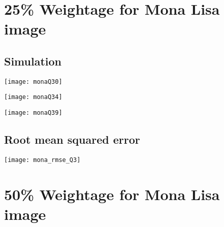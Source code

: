 \documentclass[a4paper, 12pt]{article}
\begin{document}
\section{25\% Weightage for Mona Lisa image}

\subsection{Simulation}
\begin{center}
\begin{minipage}{0.45\linewidth}
    \texttt{[image: monaQ30]}
    \label{fig:Q1_1}
\end{minipage}
\hfill
\begin{minipage}{0.45\linewidth}
    \texttt{[image: monaQ34]}
    \label{fig:Q1_2}
\end{minipage}
\vspace{1.5 em}

\begin{minipage}{0.45\linewidth}
    \texttt{[image: monaQ39]}
    \label{fig:Q1_2}
\end{minipage}
\vspace{1.5 em}
\end{center}

\subsection{Root mean squared error}

\begin{center}
\begin{minipage}{0.5\linewidth}
    \texttt{[image: mona\_rmse\_Q3]}
    \label{fig:Q1_3}
\end{minipage}
\end{center}


\section{50\% Weightage for Mona Lisa image}
\end{document}
